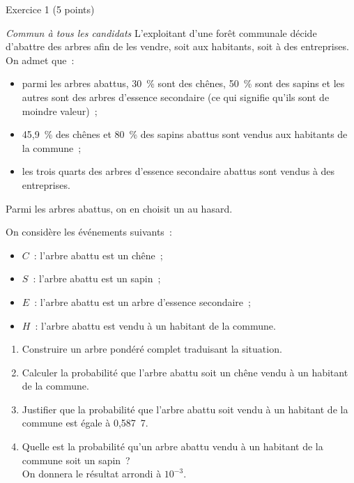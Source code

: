
%
\begin{h2}Exercice 1 (5 points)\end{h2}
\smallbreak
\textit{Commun à tous les candidats}
\bigbreak
L'exploitant d'une forêt communale décide d'abattre des arbres afin de les vendre, soit aux habitants, soit à des entreprises. On admet que~:
\begin{itemize}
     \item
     parmi les arbres abattus, 30~\% sont des chênes, 50~\% sont des sapins et les autres sont des arbres d'essence secondaire (ce qui signifie qu'ils sont de moindre valeur)~;
     \item 45,9~\% des chênes et 80~\% des sapins abattus sont vendus aux habitants de la commune~;
     \item les trois quarts des arbres d'essence secondaire abattus sont vendus à des entreprises.
\end{itemize}
\medbreak
{}
\smallbreak
Parmi les arbres abattus, on en choisit un au hasard.
\par
On considère les événements suivants~:
\begin{itemize}
     \item $C$~: \og l'arbre abattu est un chêne\fg{}~;
     \item $S$~: \og l'arbre abattu est un sapin\fg{}~;
     \item $E$~: \og l'arbre abattu est un arbre d'essence secondaire\fg{}~;
     \item $H$~: \og l'arbre abattu est vendu à un habitant de la commune\fg{}.
\end{itemize}
\bigbreak
\begin{enumerate}
     \item Construire un arbre pondéré complet traduisant la situation.
     \item Calculer la probabilité que l'arbre abattu soit un chêne  vendu à un habitant de la commune.
     \item Justifier que la probabilité que l'arbre abattu soit vendu à un habitant de la commune est égale à 0,587~7.
     \item Quelle est la probabilité qu'un arbre abattu vendu à un habitant de la commune soit un sapin~?\\On donnera le résultat arrondi  à $10^{-3}$.
\end{enumerate}
